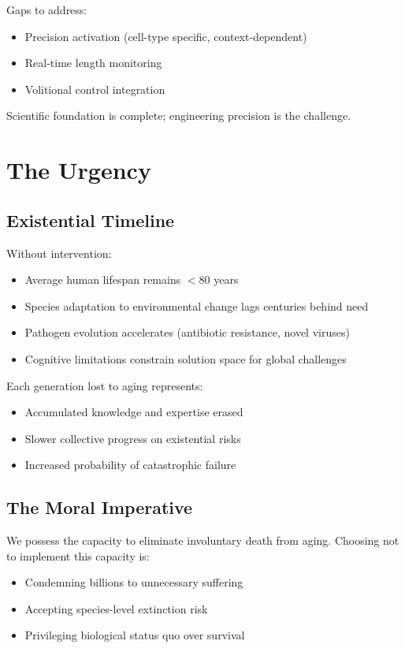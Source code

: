 \documentclass[reprint, amsmath, amssymb, aps, prd]{revtex4-2}
\begin{document}
Gaps to address:
\begin{itemize}
    \item Precision activation (cell-type specific, context-dependent)
    \item Real-time length monitoring
    \item Volitional control integration
\end{itemize}

Scientific foundation is complete; engineering precision is the challenge.

\section{The Urgency}

\subsection{Existential Timeline}

Without intervention:
\begin{itemize}
    \item Average human lifespan remains $<$80 years
    \item Species adaptation to environmental change lags centuries behind need
    \item Pathogen evolution accelerates (antibiotic resistance, novel viruses)
    \item Cognitive limitations constrain solution space for global challenges
\end{itemize}

Each generation lost to aging represents:
\begin{itemize}
    \item Accumulated knowledge and expertise erased
    \item Slower collective progress on existential risks
    \item Increased probability of catastrophic failure
\end{itemize}

\subsection{The Moral Imperative}

We possess the capacity to eliminate involuntary death from aging. Choosing not to implement this capacity is:
\begin{itemize}
    \item Condemning billions to unnecessary suffering
    \item Accepting species-level extinction risk
    \item Privileging biological status quo over survival
\end{itemize}
\end{document}
